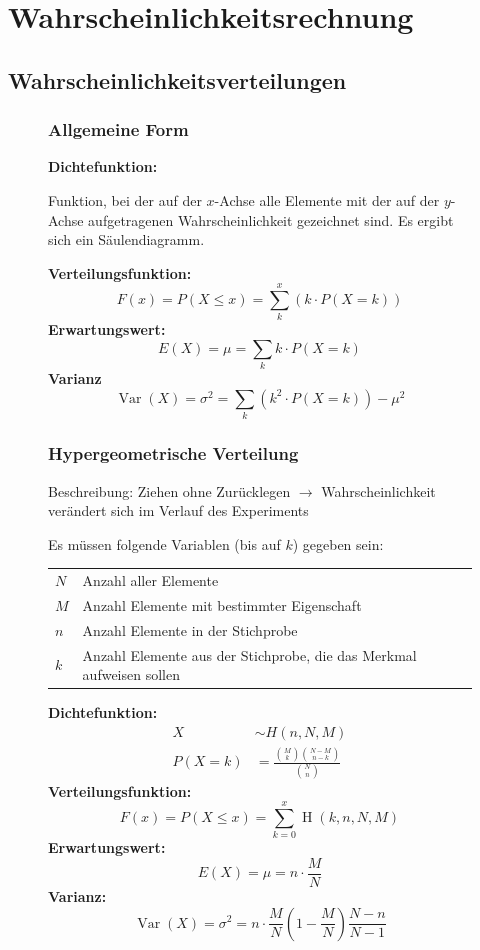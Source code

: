 \documentclass[twoside, a4paper]{report}
\begin{document}
\section{Wahrscheinlichkeitsrechnung}

\subsection{Wahrscheinlichkeitsverteilungen}

\begin{figure}[H]
  \subsubsection{Allgemeine Form}
  \textbf{Dichtefunktion:}

  Funktion, bei der auf der \(x\)-Achse alle Elemente mit der auf der \(y\)-Achse aufgetragenen Wahrscheinlichkeit gezeichnet sind. Es ergibt sich ein Säulendiagramm.

  \textbf{Verteilungsfunktion:}
  \[F(x) = P(X \leq x) = \sum_k^x(k \cdot P(X=k))\]
  \textbf{Erwartungswert:}
  \[E(X) = \mu = \sum_k k \cdot P(X=k)\]
  \textbf{Varianz}
  \[\operatorname{Var}(X) = \sigma^2 = \sum_k {(k^2 \cdot P(X=k) )} - \mu^2\]
\end{figure}

\begin{figure}[H]
  \subsubsection{Hypergeometrische Verteilung}
Beschreibung: Ziehen ohne Zurücklegen $\rightarrow$ Wahrscheinlichkeit verändert sich im Verlauf des Experiments

  Es müssen folgende Variablen (bis auf \(k\)) gegeben sein:

  \begin{tabular}{ll}
    \toprule
    \(N\) & Anzahl aller Elemente\\
    \(M\) & Anzahl Elemente mit bestimmter Eigenschaft\\
    \(n\) & Anzahl Elemente in der Stichprobe\\
    \(k\) & Anzahl Elemente aus der Stichprobe, die das Merkmal aufweisen sollen\\
    \bottomrule
  \end{tabular}

  \textbf{Dichtefunktion:}
  \begin{align*}
    X &\sim H(n, N, M)\\[1em]
    P(X = k) &= \frac{\binom{M}{k}\binom{N-M}{n-k}}{\binom{N}{n}}
  \end{align*}
  \textbf{Verteilungsfunktion:}
  \[F(x) = P(X \leq x) = \sum_{k=0}^x\operatorname{H}(k,n,N,M)\]
  \textbf{Erwartungswert:}
  \[E(X) = \mu = n \cdot \frac{M}{N}\]
  \textbf{Varianz:}
  \[\operatorname{Var}(X) = \sigma^2 = n \cdot \frac{M}{N} \left(1 - \frac{M}{N}\right) \frac{N - n}{N - 1}\]
\end{figure}
\end{document}
